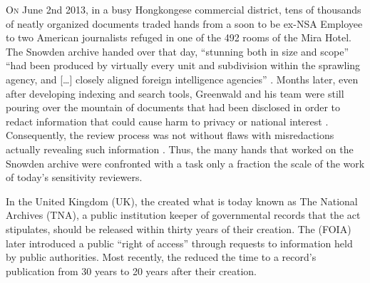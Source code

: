 \documentclass[\version]{l4proj}
\begin{document}
\lettrine[lines=3,nindent=0em]{O}{n} June 2nd 2013, in a busy Hongkongese commercial district, tens of thousands of neatly organized documents traded hands from a soon to be ex-NSA Employee to two American journalists refuged in one of the 492 rooms of the Mira Hotel.
The Snowden archive handed over that day, ``stunning both in size and scope'' ``had been produced by virtually every unit and subdivision within the sprawling agency, and [\ldots] closely aligned foreign intelligence agencies'' \autocite[77]{greenwaldNoPlaceHide2014}.
Months later, even after developing indexing and search tools, Greenwald and his team were still pouring over the mountain of documents that had been disclosed in order to redact information that could cause harm to privacy or national interest \autocite{greenwaldFactsHowNSA2014}.
Consequently, the review process was not without flaws with misredactions actually revealing such information \autocite{oliverGovernmentSurveillanceLast2015}.
Thus, the many hands that worked on the Snowden archive were confronted with a task only a fraction the scale of the work of today's sensitivity reviewers.

In the United Kingdom (UK), the \textcite{PublicRecordsAct1958} created what is today known as The National Archives (TNA), a public institution keeper of governmental records that the act stipulates, should be released within thirty years of their creation.
The \textcite{FreedomInformationAct2000} (FOIA) later introduced a public ``right of access'' through requests to information held by public authorities.
Most recently, the \textcite{ConstitutionalReformGovernance2010} reduced the time to a record's publication from 30 years to 20 years after their creation.
\end{document}
